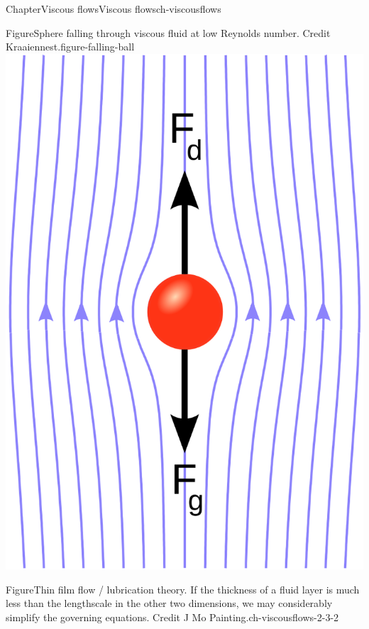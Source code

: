 \documentclass[oneside,10pt,]{book}
\numberwithin{equation}{section}
\begin{document}
\begin{chapterptx}{Chapter}{Viscous flows}{}{Viscous flows}{}{}{ch-viscousflows}
\begin{introduction}{}
\begin{sidebyside}{2}{0}{0}{0}
\begin{sbspanel}{0.5}
\begin{panelfigureptx}{Figure}{Sphere falling through viscous fluid at low Reynolds number. Credit Kraaiennest.}{figure-falling-ball}{}
\noindent\includegraphics[width=\linewidth]{external/ch-chapter07-Kraaiennest_CC-BY-SA-3.0-Stokes_sphere.svg.png}
\tcblower
\end{panelfigureptx}%
\end{sbspanel}%
\begin{sbspanel}{0.5}%
\begin{panelfigureptx}{Figure}{Thin film flow \slash{} lubrication theory. If the thickness of a fluid layer is much less than the lengthscale in the other two dimensions, we may considerably simplify the governing equations. Credit J Mo Painting.}{ch-viscousflows-2-3-2}{}%

\end{panelfigureptx}
\end{sbspanel}
\end{sidebyside}
\end{introduction}
\end{chapterptx}
\end{document}
